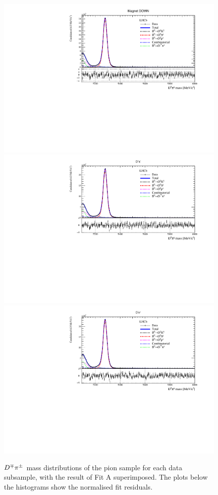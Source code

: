 \begin{figure}[t]
\begin{center}
		\includegraphics[width=0.48\linewidth]{03Massfit/figs/MDFitPlots_Bd_MD/MDFit_BeautyMass_Bd2DPi_withPulls.pdf} \\
		\includegraphics[width=0.48\linewidth]{03Massfit/figs/MDFitPlots_Bd_pim/MDFit_BeautyMass_Bd2DPi_withPulls.pdf}
		\includegraphics[width=0.48\linewidth]{03Massfit/figs/MDFitPlots_Bd_pip/MDFit_BeautyMass_Bd2DPi_withPulls.pdf} \\
		\vspace{-2mm}
                \caption{$D^\mp\pi^\pm$ mass distributions of the pion sample for each data subsample, with the result of Fit A 
                  superimposed. The plots below the histograms show the normalised fit residuals.
		\label{fig:splitfitPi}}
	\end{center}
\end{figure}
